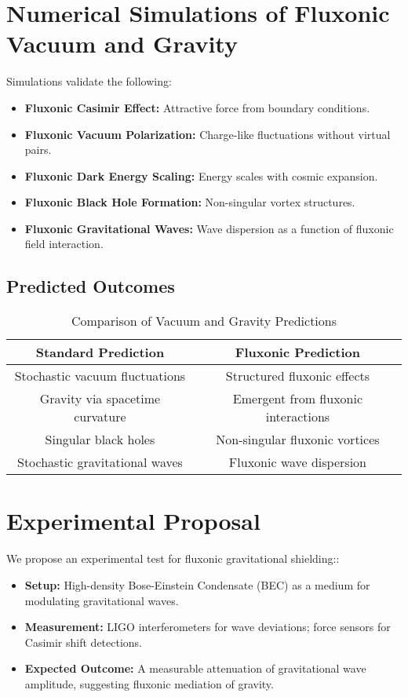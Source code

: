 \documentclass{article}
\begin{document}
\section{Numerical Simulations of Fluxonic Vacuum and Gravity}
Simulations validate the following:
\begin{itemize}
    \item \textbf{Fluxonic Casimir Effect:} Attractive force from boundary conditions.
    \item \textbf{Fluxonic Vacuum Polarization:} Charge-like fluctuations without virtual pairs.
    \item \textbf{Fluxonic Dark Energy Scaling:} Energy scales with cosmic expansion.
    \item \textbf{Fluxonic Black Hole Formation:} Non-singular vortex structures.
    \item \textbf{Fluxonic Gravitational Waves:} Wave dispersion as a function of fluxonic field interaction.
\end{itemize}

\subsection{Predicted Outcomes}
\begin{table}[h]
    \centering
    \begin{tabular}{|c|c|}
        \hline
        \textbf{Standard Prediction} & \textbf{Fluxonic Prediction} \\
        \hline
        Stochastic vacuum fluctuations & Structured fluxonic effects \\
        Gravity via spacetime curvature & Emergent from fluxonic interactions \\
        Singular black holes & Non-singular fluxonic vortices \\
        Stochastic gravitational waves & Fluxonic wave dispersion \\
        \hline
    \end{tabular}
    \caption{Comparison of Vacuum and Gravity Predictions}
    \label{tab:predictions}
\end{table}

\section{Experimental Proposal}
We propose an experimental test for fluxonic gravitational shielding:\cite{fluxonic_shielding}:
\begin{itemize}
    \item \textbf{Setup:} High-density Bose-Einstein Condensate (BEC) as a medium for modulating gravitational waves.
    \item \textbf{Measurement:} LIGO interferometers for wave deviations; force sensors for Casimir shift detections.
    \item \textbf{Expected Outcome:} A measurable attenuation of gravitational wave amplitude, suggesting fluxonic mediation of gravity.
\end{itemize}



\end{document}
